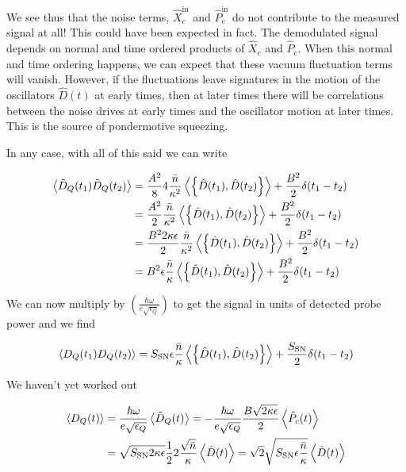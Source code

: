 \documentclass[12pt]{article}
\begin{document}
We see thus that the noise terms, $\hat{X}_c^{\text{in}}$ and $\hat{P}_c^{\text{in}}$ do not contribute to the measured signal at all! This could have been expected in fact. The demodulated signal depends on normal and time ordered products of $\hat{X}_c$ and $\hat{P}_c$. When this normal and time ordering happens, we can expect that these vacuum fluctuation terms will vanish. However, if the fluctuations leave signatures in the motion of the oscillators $\hat{D}(t)$ at early times, then at later times there will be correlations between the noise drives at early times and the oscillator motion at later times. This is the source of pondermotive squeezing.

In any case, with all of this said we can write

\begin{align}
\Braket{\tilde{D}_Q(t_1)\tilde{D}_Q(t_2)} &= \frac{A^2}{8} 4 \frac{\bar{n}}{\kappa^2} \Braket{\left\{\hat{D}(t_1),\hat{D}(t_2)\right\}} + \frac{B^2}{2} \delta(t_1-t_2)\\
&= \frac{A^2}{2} \frac{\bar{n}}{\kappa^2}\Braket{\left\{\hat{D}(t_1),\hat{D}(t_2)\right\}} + \frac{B^2}{2} \delta(t_1-t_2)\\
&= \frac{B^2 2\kappa \epsilon}{2} \frac{\bar{n}}{\kappa^2}\Braket{\left\{\hat{D}(t_1),\hat{D}(t_2)\right\}} + \frac{B^2}{2} \delta(t_1-t_2)\\
&= B^2 \epsilon \frac{\bar{n}}{\kappa} \Braket{\left\{\hat{D}(t_1),\hat{D}(t_2)\right\}} + \frac{B^2}{2} \delta(t_1-t_2)\\
\end{align}

We can now multiply by $\left(\frac{\hbar \omega}{e \sqrt{\epsilon_Q}}\right)$ to get the signal in units of detected probe power and we find

\begin{align}
\Braket{D_Q(t_1)D_Q(t_2)} &= S_{\text{SN}} \epsilon \frac{\bar{n}}{\kappa} \Braket{\left\{\hat{D}(t_1),\hat{D}(t_2)\right\}} + \frac{S_{\text{SN}}}{2} \delta(t_1-t_2)\\
\end{align}

We haven't yet worked out

\begin{align}
\Braket{D_{Q}(t)} &= \frac{\hbar \omega}{e \sqrt{\epsilon_Q}} \Braket{\tilde{D}_Q(t)} = -\frac{\hbar\omega}{e \sqrt{\epsilon_Q}} \frac{B \sqrt{2 \kappa \epsilon}}{2} \Braket{\hat{P}_c(t)}\\
&= \sqrt{S_{\text{SN}} 2 \kappa \epsilon}\frac{1}{2} 2 \frac{\sqrt{\bar{n}}}{\kappa} \Braket{\hat{D}(t)} = \sqrt{2}\sqrt{S_{\text{SN}}\epsilon \frac{\bar{n}}{\kappa}}\Braket{\hat{D}(t)}
\end{align}
\end{document}
